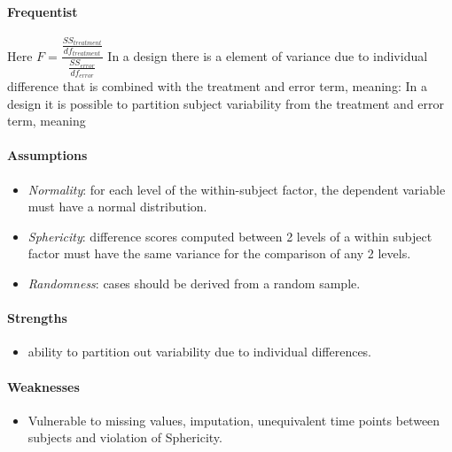 \paragraph{Frequentist}
Here $F = \dfrac{\frac{SS_{treatment}}{df_{treatment}}}{\frac{SS_{error}}{df_{error}}}$
In a  design there is a element of variance due to individual 
difference that is combined with the treatment and error term, meaning: 
In a  design it is possible to partition subject variability from the
treatment and error term, meaning 

\paragraph{Assumptions}
\begin{itemize}
    \item \emph{Normality}: for each level of the within-subject factor, the dependent variable must have a normal distribution.
    \item \emph{Sphericity}: difference scores computed between 2 levels of a within subject factor must have the same variance
    for the comparison of any 2 levels.
    \item \emph{Randomness}: cases should be derived from a random sample.
\end{itemize}
\paragraph{Strengths}
\begin{itemize}
    \item ability to partition out variability due to individual differences.
\end{itemize}
\paragraph{Weaknesses}
\begin{itemize}
    \item Vulnerable to missing values, imputation, unequivalent time points
    between subjects and violation of Sphericity.
\end{itemize}

